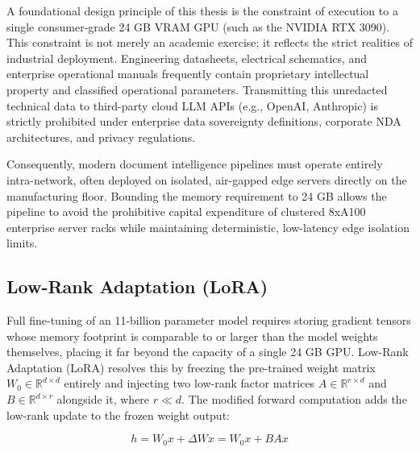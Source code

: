 A foundational design principle of this thesis is the constraint of execution to a single consumer-grade 24 GB VRAM GPU (such as the NVIDIA RTX 3090). This constraint is not merely an academic exercise; it reflects the strict realities of industrial deployment. Engineering datasheets, electrical schematics, and enterprise operational manuals frequently contain proprietary intellectual property and classified operational parameters. Transmitting this unredacted technical data to third-party cloud LLM APIs (e.g., OpenAI, Anthropic) is strictly prohibited under enterprise data sovereignty definitions, corporate NDA architectures, and privacy regulations.

Consequently, modern document intelligence pipelines must operate entirely intra-network, often deployed on isolated, air-gapped edge servers directly on the manufacturing floor. Bounding the memory requirement to 24 GB allows the pipeline to avoid the prohibitive capital expenditure of clustered 8xA100 enterprise server racks while maintaining deterministic, low-latency edge isolation limits.

\subsection{Low-Rank Adaptation (LoRA)}

Full fine-tuning of an 11-billion parameter model requires storing gradient tensors whose memory footprint is comparable to or larger than the model weights themselves, placing it far beyond the capacity of a single 24 GB GPU. Low-Rank Adaptation (LoRA) \citep{lora} resolves this by freezing the pre-trained weight matrix $W_0 \in \mathbb{R}^{d \times d}$ entirely and injecting two low-rank factor matrices $A \in \mathbb{R}^{r \times d}$ and $B \in \mathbb{R}^{d \times r}$ alongside it, where $r \ll d$. The modified forward computation adds the low-rank update to the frozen weight output:

\begin{equation}
h = W_0 x + \Delta W x = W_0 x + B A x
\end{equation}

